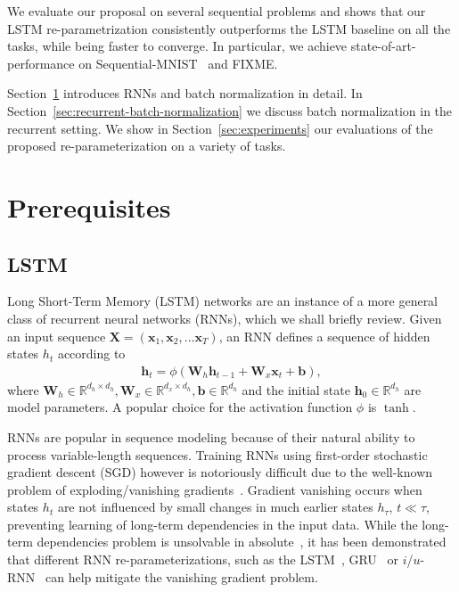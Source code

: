 \documentclass{article} %
\newcommand{\vect}[1]{\mathbf{#1}}
\newcommand{\mat}[1]{\mathbf{#1}}
\newcommand{\reals}{\mathbb{R}}
\begin{document}
We evaluate our proposal on several sequential problems and shows that our
LSTM re-parametrization consistently outperforms the LSTM baseline on all the tasks, while being faster to converge. In particular, we achieve state-of-art-performance on Sequential-MNIST~\cite{le2015simple} and FIXME.


Section~\ref{sec:prerequisites} introduces RNNs and batch normalization in detail.
In Section~\ref{sec:recurrent-batch-normalization} we discuss batch normalization in the recurrent setting.
We show in Section~\ref{sec:experiments} our evaluations of the proposed re-parameterization on a variety of tasks.

\section{Prerequisites}
\label{sec:prerequisites}


\subsection{LSTM}

Long Short-Term Memory (LSTM) networks are an instance of a more general class of recurrent neural networks (RNNs),
which we shall briefly review.
Given an input sequence
$\mat{X} = ( \vect{x}_1, \vect{x}_2, ... \vect{x}_T )$,
an RNN defines a sequence of hidden states $h_t$ according to
\begin{eqnarray}
  \mat{h}_t = \phi(\mat{W}_h \vect{h}_{t-1} + \mat{W}_x  \vect{x}_t + \vect{b}),
\end{eqnarray}
where $\mat{W}_h \in \reals^{d_h \times d_h}, \mat{W}_x \in \reals^{d_x \times d_h}, \vect{b} \in \reals^{d_h}$
and the initial state $\vect{h}_0 \in \reals^{d_h}$ %
are model parameters.
A popular choice for the activation function $\phi$ is $\tanh$.

RNNs are popular in sequence modeling because of their natural ability to process variable-length sequences.
Training RNNs using first-order stochastic gradient descent (SGD) however is notoriously difficult
due to the well-known problem of exploding/vanishing gradients~\cite{bengio1994learning,hochreiter1991untersuchungen,pascanudifficulty}.
Gradient vanishing occurs when states $h_t$ are not influenced by small changes in much earlier states $h_{\tau}$, $t \ll \tau$,
preventing learning of long-term dependencies in the input data.
While the long-term dependencies problem is unsolvable in absolute~\cite{bengio1994learning},
it has been demonstrated that different RNN re-parameterizations, such as the LSTM~\cite{lstm}, GRU~\cite{cho2014learning} or $i$/$u$-RNN~\cite{le2015simple,urnn}
can help mitigate the vanishing gradient problem.
\end{document}
